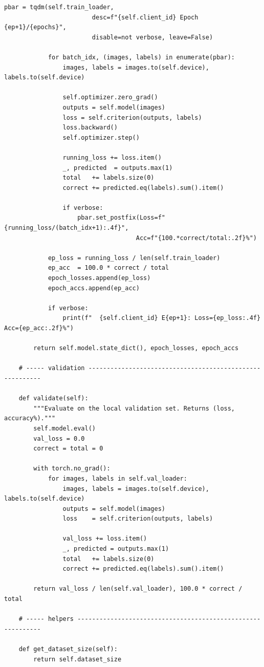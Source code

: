 \begin{lstlisting}[caption={Federated Client (client.py)}, label={lst:client}]
            pbar = tqdm(self.train_loader,
                        desc=f"{self.client_id} Epoch {ep+1}/{epochs}",
                        disable=not verbose, leave=False)

            for batch_idx, (images, labels) in enumerate(pbar):
                images, labels = images.to(self.device), labels.to(self.device)

                self.optimizer.zero_grad()
                outputs = self.model(images)
                loss = self.criterion(outputs, labels)
                loss.backward()
                self.optimizer.step()

                running_loss += loss.item()
                _, predicted  = outputs.max(1)
                total   += labels.size(0)
                correct += predicted.eq(labels).sum().item()

                if verbose:
                    pbar.set_postfix(Loss=f"{running_loss/(batch_idx+1):.4f}",
                                    Acc=f"{100.*correct/total:.2f}%")

            ep_loss = running_loss / len(self.train_loader)
            ep_acc  = 100.0 * correct / total
            epoch_losses.append(ep_loss)
            epoch_accs.append(ep_acc)

            if verbose:
                print(f"  {self.client_id} E{ep+1}: Loss={ep_loss:.4f}  Acc={ep_acc:.2f}%")

        return self.model.state_dict(), epoch_losses, epoch_accs

    # ----- validation ---------------------------------------------------------

    def validate(self):
        """Evaluate on the local validation set. Returns (loss, accuracy%)."""
        self.model.eval()
        val_loss = 0.0
        correct = total = 0

        with torch.no_grad():
            for images, labels in self.val_loader:
                images, labels = images.to(self.device), labels.to(self.device)
                outputs = self.model(images)
                loss    = self.criterion(outputs, labels)

                val_loss += loss.item()
                _, predicted = outputs.max(1)
                total   += labels.size(0)
                correct += predicted.eq(labels).sum().item()

        return val_loss / len(self.val_loader), 100.0 * correct / total

    # ----- helpers ------------------------------------------------------------

    def get_dataset_size(self):
        return self.dataset_size
\end{lstlisting}


